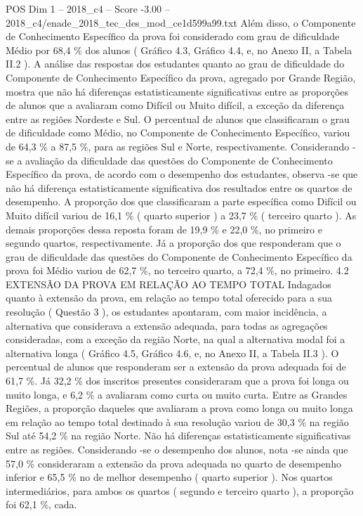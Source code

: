 \begin{textsample}{POS Dim 1 – 2018\_c4 – Score -3.00 – 2018\_c4/enade\_2018\_tec\_des\_mod\_ce1d599a99.txt}
Além disso, o Componente de Conhecimento Específico da prova foi considerado com grau de dificuldade Médio por 68,4 \% dos alunos ( Gráfico 4.3, Gráfico 4.4, e, no Anexo II, a Tabela II.2 ).
A análise das respostas dos estudantes quanto ao grau de dificuldade do Componente de Conhecimento Específico da prova, agregado por Grande Região, mostra que não há diferenças estatisticamente significativas entre as proporções de alunos que a avaliaram como Difícil ou Muito difícil, a exceção da diferença entre as regiões Nordeste e Sul.
O percentual de alunos que classificaram o grau de dificuldade como Médio, no Componente de Conhecimento Específico, variou de 64,3 \% a 87,5 \%, para as regiões Sul e Norte, respectivamente.
Considerando -se a avaliação da dificuldade das questões do Componente de Conhecimento Específico da prova, de acordo com o desempenho dos estudantes, observa -se que não há diferença estatisticamente significativa dos resultados entre os quartos de desempenho.
A proporção dos que classificaram a parte específica como Difícil ou Muito difícil variou de 16,1 \% ( quarto superior ) a 23,7 \% ( terceiro quarto ).
As demais proporções dessa reposta foram de 19,9 \% e 22,0 \%, no primeiro e segundo quartos, respectivamente.
Já a proporção dos que responderam que o grau de dificuldade das questões do Componente de Conhecimento Específico da prova foi Médio variou de 62,7 \%, no terceiro quarto, a 72,4 \%, no primeiro. 4.2 EXTENSÃO DA PROVA EM RELAÇÃO AO TEMPO TOTAL Indagados quanto à extensão da prova, em relação ao tempo total oferecido para a sua resolução ( Questão 3 ), os estudantes apontaram, com maior incidência, a alternativa que considerava a extensão adequada, para todas as agregações consideradas, com a exceção da região Norte, na qual a alternativa modal foi a alternativa longa ( Gráfico 4.5, Gráfico 4.6, e, no Anexo II, a Tabela II.3 ).
O percentual de alunos que responderam ser a extensão da prova adequada foi de 61,7 \%.
Já 32,2 \% dos inscritos presentes consideraram que a prova foi longa ou muito longa, e 6,2 \% a avaliaram como curta ou muito curta.
Entre as Grandes Regiões, a proporção daqueles que avaliaram a prova como longa ou muito longa em relação ao tempo total destinado à sua resolução variou de 30,3 \% na região Sul até 54,2 \% na região Norte.
Não há diferenças estatisticamente significativas entre as regiões.
Considerando -se o desempenho dos alunos, nota -se ainda que 57,0 \% consideraram a extensão da prova adequada no quarto de desempenho inferior e 65,5 \% no de melhor desempenho ( quarto superior ).
Nos quartos intermediários, para ambos os quartos ( segundo e terceiro quarto ), a proporção foi 62,1 \%, cada.

\end{textsample}
